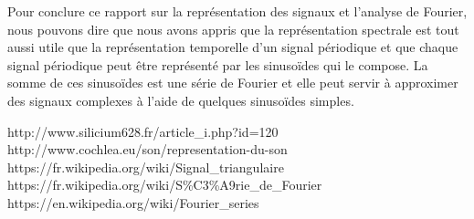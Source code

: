 \documentclass[a4paper]{article}
\begin{document}
Pour conclure ce rapport sur la représentation des signaux et l'analyse de Fourier, nous pouvons dire que nous avons appris que la représentation spectrale est tout aussi utile que la représentation temporelle d'un signal périodique et que chaque signal périodique peut être représenté par les sinusoïdes qui le compose. La somme de ces sinusoïdes est une série de Fourier et elle peut servir à approximer des signaux complexes à l'aide de quelques sinusoïdes simples.















\newpage \tableofcontents \listoffigures
\begin{thebibliography}{9}

 http://www.silicium628.fr/article\_i.php?id=120
 http://www.cochlea.eu/son/representation-du-son
 https://fr.wikipedia.org/wiki/Signal\_triangulaire
 https://fr.wikipedia.org/wiki/S\%C3\%A9rie\_de\_Fourier
 https://en.wikipedia.org/wiki/Fourier\_series

\end{thebibliography}
\end{document}

